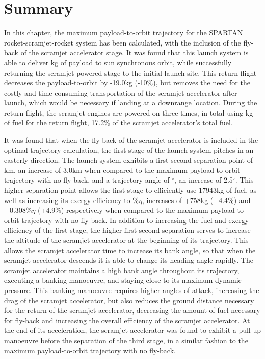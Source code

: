 \section{Summary}

In this chapter, the maximum payload-to-orbit trajectory for the SPARTAN rocket-scramjet-rocket system has been calculated, with the inclusion of the fly-back of the scramjet accelerator stage. It was found that this launch system is able to deliver \PayloadToOrbitStandard kg of payload to sun synchronous orbit, while successfully returning the scramjet-powered stage to the initial launch site. 
This return flight decreases the payload-to-orbit by -19.0kg (-10\%), but removes the need for the costly and time consuming transportation of the scramjet accelerator after launch, which would be necessary if landing at a downrange location.
During the return flight, the scramjet engines are powered on three times, in total using \returnFuelStandard kg of fuel for the return flight, 17.2\% of the scramjet accelerator's total fuel.

It was found that when the fly-back of the scramjet accelerator is included in the optimal trajectory calculation, the first stage of the launch system pitches in an easterly direction. 
The launch system exhibits a first-second separation point of \firstsecondSeparationAltStandard km, an increase of 3.0km when compared to the maximum payload-to-orbit trajectory with no fly-back, and a trajectory angle of \firstsecondSeparationgammaStandard $^\circ$, an increase of 2.5$^\circ$. 
This higher separation point allows the first stage to efficiently use 17943kg of fuel, as well as increasing its exergy efficiency to \firstExergyEffStandard \%$\eta$, increases of +758kg (+4.4\%) and +0.308\%$\eta$ (+4.9\%) respectively when compared to the maximum payload-to-orbit trajectory with no fly-back.
In addition to increasing the fuel and exergy efficiency of the first stage, the higher first-second separation serves to increase the altitude of the scramjet accelerator at the beginning of its trajectory. This allows the scramjet accelerator time to increase its bank angle, so that when the scramjet accelerator descends it is able to change its heading angle rapidly. The scramjet accelerator maintains a high bank angle throughout its trajectory, executing a banking manoeuvre, and staying close to its maximum dynamic pressure. 
This banking manoeuvre requires higher angles of attack, increasing the drag of the scramjet accelerator, but also reduces the ground distance necessary for the return of the scramjet accelerator, decreasing the amount of fuel necessary for fly-back and increasing the overall efficiency of the scramjet accelerator. 
At the end of its acceleration, the scramjet accelerator was found to exhibit a pull-up manoeuvre before the separation of the third stage, in a similar fashion to the maximum payload-to-orbit trajectory with no fly-back. 

